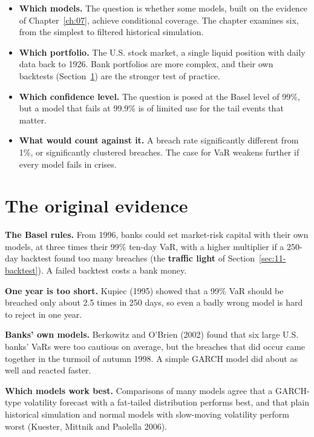\begin{itemize}
  \item \textbf{Which models.} The question is whether some models, built on the evidence of Chapter~\ref{ch:07}, achieve conditional coverage. The chapter examines six, from the simplest to filtered historical simulation.
  \item \textbf{Which portfolio.} The U.S. stock market, a single liquid position with daily data back to 1926. Bank portfolios are more complex, and their own backtests (Section~\ref{sec:11-evidence}) are the stronger test of practice.
  \item \textbf{Which confidence level.} The question is posed at the Basel level of 99\%, but a model that fails at 99.9\% is of limited use for the tail events that matter.
  \item \textbf{What would count against it.} A breach rate significantly different from 1\%, or significantly clustered breaches. The case for VaR weakens further if every model fails in crises.
\end{itemize}

\section{The original evidence}
\label{sec:11-evidence}

\textbf{The Basel rules.} From 1996, banks could set market-risk capital with their own models, at three times their 99\% ten-day VaR, with a higher multiplier if a 250-day backtest found too many breaches (the \textbf{traffic light} of Section~\ref{sec:11-backtest}). A failed backtest costs a bank money.

\textbf{One year is too short.} Kupiec (1995) showed that a 99\% VaR should be breached only about 2.5 times in 250 days, so even a badly wrong model is hard to reject in one year.

\textbf{Banks' own models.} Berkowitz and O'Brien (2002) found that six large U.S. banks' VaRs were too cautious on average, but the breaches that did occur came together in the turmoil of autumn 1998. A simple GARCH model did about as well and reacted faster.

\textbf{Which models work best.} Comparisons of many models agree that a GARCH-type volatility forecast with a fat-tailed distribution performs best, and that plain historical simulation and normal models with slow-moving volatility perform worst (Kuester, Mittnik and Paolella 2006).

